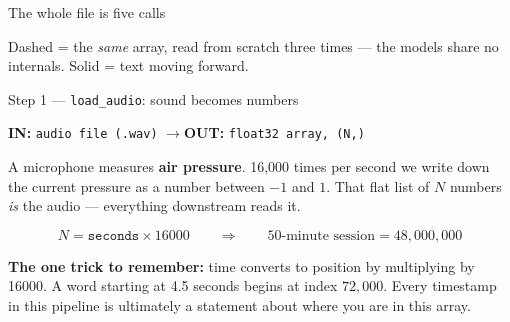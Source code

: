 \documentclass[aspectratio=169]{beamer}
\newcommand{\shapebox}[2]{%
  \begin{center}
  \colorbox{black!8}{\parbox{0.9\textwidth}{\centering
  \textbf{IN:} \texttt{#1} \qquad$\longrightarrow$\qquad \textbf{OUT:} \texttt{#2}}}
  \end{center}}
\begin{document}
\begin{frame}{The whole file is five calls}
\begin{center}
{}
\end{center}

{\scriptsize Dashed = the \emph{same} array, read from scratch three times --- the models
share no internals. Solid = text moving forward.}

\end{frame}

\begin{frame}{Step 1 --- \texttt{load\_audio}: sound becomes numbers}

\shapebox{audio file (.wav)}{float32 array, (N,)}

A microphone measures \textbf{air pressure}. 16{,}000 times per second we write down the
current pressure as a number between $-1$ and $1$. That flat list of $N$ numbers \emph{is}
the audio --- everything downstream reads it.

\vspace{0.8em}
\[
N = \texttt{seconds} \times 16000
\qquad\Longrightarrow\qquad
\text{50-minute session} = 48{,}000{,}000
\]

\vspace{0.5em}
\textbf{The one trick to remember:} time converts to position by multiplying by 16000. A
word starting at 4.5 seconds begins at index $72{,}000$. Every timestamp in this pipeline
is ultimately a statement about where you are in this array.

\end{frame}
\end{document}
